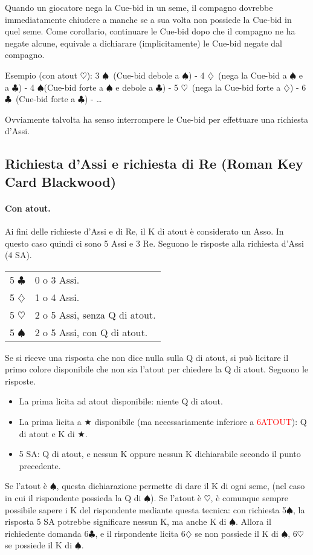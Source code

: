 \documentclass[a4paper,10pt]{article}
\renewcommand{\c}{$\clubsuit$\xspace}
\renewcommand{\d}{$\diamondsuit$\xspace}
\newcommand{\h}{$\heartsuit$\xspace}
\newcommand{\s}{$\spadesuit$\xspace}
\renewcommand{\j}{$\bigstar$\xspace}
\newcommand{\sa}{SA\xspace}
\newcommand{\smallspace}{\vskip0.3cm}
\newcommand{\note}[1]{\textcolor{red}{#1}}
\newenvironment{twocol}
  {\smallspace\noindent\begin{tabular}{l p{0.8\textwidth}}}
  {\end{tabular}\smallspace}
\begin{document}
Quando un giocatore nega la Cue-bid in un seme, il compagno dovrebbe immediatamente chiudere a manche se a sua volta non possiede la Cue-bid in quel seme.
Come corollario, continuare le Cue-bid dopo che il compagno ne ha negate alcune, equivale a dichiarare (implicitamente) le Cue-bid negate dal compagno.

Esempio (con atout \h): 3 \s\  (Cue-bid debole a \s) - 4 \d\ (nega la Cue-bid a \s e a \c) - 4 \s (Cue-bid forte a \s e debole a \c) - 5 \h\ (nega la Cue-bid forte a \d) - 6 \c\ (Cue-bid forte a \c) - \dots

Ovviamente talvolta ha senso interrompere le Cue-bid per effettuare una richiesta d'Assi.


\subsection{Richiesta d'Assi e richiesta di Re (Roman Key Card Blackwood)}

\paragraph{Con atout.} Ai fini delle richieste d'Assi e di Re, il K di atout \`e considerato un Asso. In questo caso quindi ci sono 5 Assi e 3 Re. Seguono le risposte alla richiesta d'Assi (4 \sa).
\begin{twocol}
5 \c & 0 o 3 Assi.\\
5 \d & 1 o 4 Assi.\\
5 \h & 2 o 5 Assi, senza Q di atout.\\
5 \s & 2 o 5 Assi, con Q di atout.\\
\end{twocol}

\noindent Se si riceve una risposta che non dice nulla sulla Q di atout, si può licitare il primo colore disponibile che non sia l'atout per chiedere la Q di atout. Seguono le risposte.

\begin{itemize}
 \item La prima licita ad atout disponibile: niente Q di atout.
 \item La prima licita a \j disponibile (ma necessariamente inferiore a \note{6ATOUT}): Q di atout e K di \j.
 \item 5 \sa: Q di atout, e nessun K oppure nessun K dichiarabile secondo il punto precedente.
\end{itemize}

Se l'atout è \s, questa dichiarazione permette di dare il K di ogni seme, (nel caso in cui il rispondente possieda la Q di \s). Se l'atout è \h, è comunque sempre possibile sapere i K del rispondente mediante questa tecnica: con richiesta 5\s, la risposta 5 \sa potrebbe significare nessun K, ma anche K di \s.
Allora il richiedente domanda 6\c, e il rispondente licita 6\d se non possiede il K di \s, 6\h se possiede il K di \s.
\end{document}

